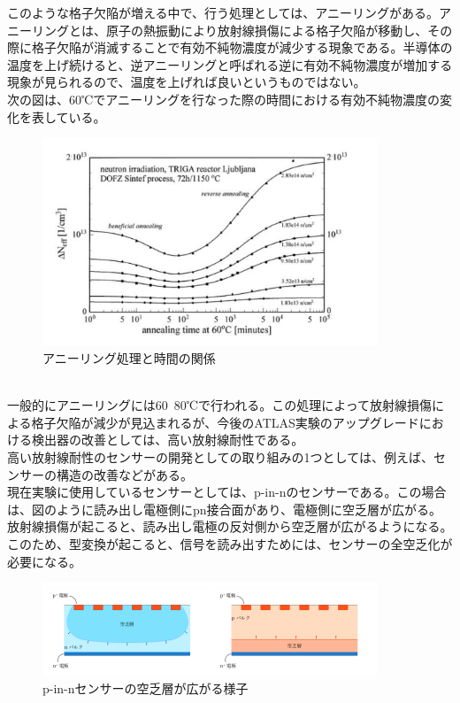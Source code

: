 \documentclass{jreport}
\begin{document}
このような格子欠陥が増える中で、行う処理としては、アニーリングがある。アニーリングとは、原子の熱振動により放射線損傷による格子欠陥が移動し、その際に格子欠陥が消滅することで有効不純物濃度が減少する現象である。半導体の温度を上げ続けると、逆アニーリングと呼ばれる逆に有効不純物濃度が増加する現象が見られるので、温度を上げれば良いというものではない。\\
次の図は、60℃でアニーリングを行なった際の時間における有効不純物濃度の変化を表している。\\
\begin{figure}[htbp]
	\begin{center}
	\includegraphics[width=100mm]{annealing.png}
	\end{center}
	\caption{アニーリング処理と時間の関係}
	\label{fig:eight}
\end{figure}
\\
一般的にアニーリングには60~80℃で行われる。この処理によって放射線損傷による格子欠陥が減少が見込まれるが、今後のATLAS実験のアップグレードにおける検出器の改善としては、高い放射線耐性である。\\
高い放射線耐性のセンサーの開発としての取り組みの1つとしては、例えば、センサーの構造の改善などがある。\\
現在実験に使用しているセンサーとしては、p-in-nのセンサーである。この場合は、図のように読み出し電極側にpn接合面があり、電極側に空乏層が広がる。放射線損傷が起こると、読み出し電極の反対側から空乏層が広がるようになる。このため、型変換が起こると、信号を読み出すためには、センサーの全空乏化が必要になる。\\

\begin{figure}[htbp]
	\begin{center}
	\includegraphics[width=100mm]{pn.png}
	\end{center}
	\caption{p-in-nセンサーの空乏層が広がる様子}
	\label{fig:nine}
\end{figure}
\end{document}
